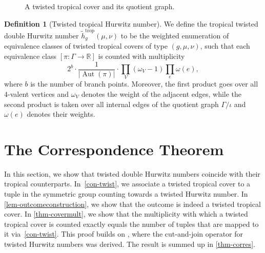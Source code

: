 \documentclass[10pt]{amsart}
\theoremstyle{plain}
\theoremstyle{definition}
\newtheorem{defi}[defi]{Definition}
\theoremstyle{definition}
\theoremstyle{plain}
\theoremstyle{plain}
\theoremstyle{remark}
\theoremstyle{plain}
\theoremstyle{plain}
\DeclareMathOperator{\Aut}{Aut}
\DeclareMathOperator{\trop}{trop}
\begin{document}
\begin{figure}
\caption{A twisted tropical cover and its quotient graph.}
\label{fig:extwist}
\end{figure}

\begin{defi}[Twisted tropical Hurwitz number]
\label{def:twisttrophn}
We define the tropical twisted double Hurwitz 
number $\tilde{h}^{\trop}_g(\mu,\nu)$ to be  the weighted enumeration of equivalence classes of twisted tropical covers of type $(g,\mu,\nu)$, such that each equivalence class $[\pi\colon \Gamma\to\mathbb{R}]$ is counted with multiplicity
\begin{equation*}
    2^{b}\cdot \frac{1}{|\Aut(\pi)|}\cdot\prod_V (\omega_V-1)\prod_e\omega(e),
\end{equation*}
where $b$ is the number of branch points. Moreover, the first product goes over all $4$-valent vertices and $\omega_V$ denotes the weight of the adjacent edges, while the second product is taken over all internal edges of the quotient graph $\Gamma/\iota$ and $\omega(e)$ denotes their weights.
\end{defi}

\section{The Correspondence Theorem}
\label{sec:corr}
In this section, we show that  twisted double Hurwitz numbers coincide with their tropical counterparts.
In~\cref{con-twist}, we associate a twisted tropical cover to a tuple in the symmetric group counting towards a twisted Hurwitz number. In \cref{lem-outcomeconstruction}, we show that the outcome is indeed a twisted tropical cover. In \cref{thm-covermult}, we show that the multiplicity with which a twisted tropical cover is counted exactly equals the number of tuples that are mapped to it via~\cref{con-twist}. This proof builds on \cite[Theorem 2.12]{BF21}, where the cut-and-join operator for twisted Hurwitz numbers was derived.
The result is summed up in \cref{thm-corres}.
\end{document}
